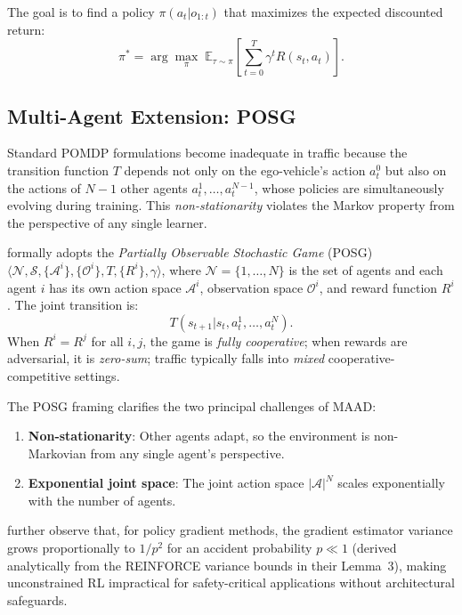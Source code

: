 \documentclass[12pt, a4paper]{article}
\begin{document}
The goal is to find a policy $\pi(a_t | o_{1:t})$ that maximizes the expected
discounted return:
\begin{equation}
  \pi^* = \arg\max_\pi \; \mathbb{E}_{\tau \sim \pi}
          \!\left[ \sum_{t=0}^{T} \gamma^t R(s_t, a_t) \right].
  \label{eq:pomdp}
\end{equation}

\subsection{Multi-Agent Extension: POSG}
Standard POMDP formulations become inadequate in traffic because the transition
function $T$ depends not only on the ego-vehicle's action $a^0_t$ but also on
the actions of $N-1$ other agents $a^1_t, \dots, a^{N-1}_t$, whose policies are
simultaneously evolving during training. This \emph{non-stationarity} violates the
Markov property from the perspective of any single learner.

\citet{palanisamy2020multi} formally adopts the \emph{Partially Observable
Stochastic Game} (POSG) $\langle \mathcal{N}, \mathcal{S}, \{\mathcal{A}^i\},
\{\mathcal{O}^i\}, T, \{R^i\}, \gamma \rangle$, where $\mathcal{N} =
\{1,\dots,N\}$ is the set of agents and each agent $i$ has its own action space
$\mathcal{A}^i$, observation space $\mathcal{O}^i$, and reward function $R^i$.
The joint transition is:
\begin{equation}
  T(s_{t+1} | s_t, a^1_t, \dots, a^N_t).
\end{equation}
When $R^i = R^j$ for all $i, j$, the game is \emph{fully cooperative}; when
rewards are adversarial, it is \emph{zero-sum}; traffic typically falls into
\emph{mixed} cooperative-competitive settings.

The POSG framing clarifies the two principal challenges of MAAD:
\begin{enumerate}[noitemsep]
  \item \textbf{Non-stationarity}: Other agents adapt, so the environment is
        non-Markovian from any single agent's perspective.
  \item \textbf{Exponential joint space}: The joint action space
        $|\mathcal{A}|^N$ scales exponentially with the number of agents.
\end{enumerate}

\citet{shalev2016safe} further observe that, for policy gradient methods,
the gradient estimator variance grows proportionally to $1/p^2$ for an accident
probability $p \ll 1$ (derived analytically from the REINFORCE variance bounds
in their Lemma~3), making unconstrained RL impractical for safety-critical
applications without architectural safeguards.
\end{document}
